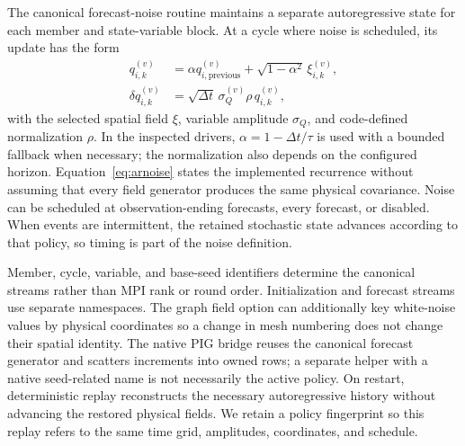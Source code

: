 \documentclass[11pt,a4paper]{article}
\begin{document}
The canonical forecast-noise routine maintains a separate autoregressive state for each member and state-variable block. At a cycle where noise is scheduled, its update has the form
\begin{align}
 q_{i,k}^{(v)}&=\alpha q_{i,\mathrm{previous}}^{(v)}
             +\sqrt{1-\alpha^2}\,\xi_{i,k}^{(v)},\\
 \delta q_{i,k}^{(v)}&=\sqrt{\Delta t}\,\sigma_Q^{(v)}\rho\,q_{i,k}^{(v)},
 \label{eq:arnoise}
\end{align}
with the selected spatial field \(\xi\), variable amplitude \(\sigma_Q\), and code-defined normalization \(\rho\). In the inspected drivers, \(\alpha=1-\Delta t/\tau\) is used with a bounded fallback when necessary; the normalization also depends on the configured horizon. Equation~\ref{eq:arnoise} states the implemented recurrence without assuming that every field generator produces the same physical covariance. Noise can be scheduled at observation-ending forecasts, every forecast, or disabled. When events are intermittent, the retained stochastic state advances according to that policy, so timing is part of the noise definition.

Member, cycle, variable, and base-seed identifiers determine the canonical streams rather than MPI rank or round order. Initialization and forecast streams use separate namespaces. The graph field option can additionally key white-noise values by physical coordinates so a change in mesh numbering does not change their spatial identity. The native PIG bridge reuses the canonical forecast generator and scatters increments into owned rows; a separate helper with a native seed-related name is not necessarily the active policy. On restart, deterministic replay reconstructs the necessary autoregressive history without advancing the restored physical fields. We retain a policy fingerprint so this replay refers to the same time grid, amplitudes, coordinates, and schedule.
\end{document}
